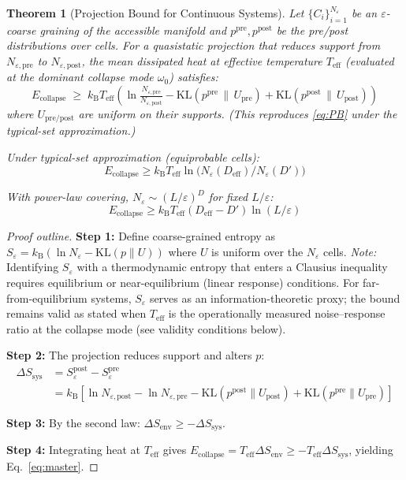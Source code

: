 \documentclass[12pt]{article}
\numberwithin{equation}{section}
\newtheorem{theorem}{Theorem}[section]
\newcommand{\kB}{k_{\mathrm{B}}}
\newcommand{\Teff}{T_{\mathrm{eff}}}
\newcommand{\KL}[2]{\mathrm{KL}\!\left(#1\,\|\,#2\right)}
\begin{document}
\begin{theorem}[Projection Bound for Continuous Systems]
\label{thm:projection}
Let $\{C_i\}_{i=1}^{N_\varepsilon}$ be an $\varepsilon$-coarse graining of the accessible manifold and $p^{\mathrm{pre}},p^{\mathrm{post}}$ be the pre/post distributions over cells. For a quasistatic projection that reduces support from $N_{\varepsilon,\mathrm{pre}}$ to $N_{\varepsilon,\mathrm{post}}$, the mean dissipated heat at effective temperature $\Teff$ (evaluated at the dominant collapse mode $\omega_0$) satisfies:
\begin{equation}
\boxed{E_{\mathrm{collapse}} \;\ge\; \kB\Teff
\left(
\ln \tfrac{N_{\varepsilon,\mathrm{pre}}}{N_{\varepsilon,\mathrm{post}}}
- \KL{p^{\mathrm{pre}}}{U_{\mathrm{pre}}}
+ \KL{p^{\mathrm{post}}}{U_{\mathrm{post}}}
\right)}
\label{eq:master}
\end{equation}
where $U_{\mathrm{pre/post}}$ are uniform on their supports. (This reproduces \eqref{eq:PB} under the typical-set approximation.)

Under typical-set approximation (equiprobable cells):
\begin{equation}
E_{\mathrm{collapse}} \ge \kB\Teff \ln\!\big(N_\varepsilon(D_{\mathrm{eff}})/N_\varepsilon(D')\big)
\end{equation}

With power-law covering, $N_\varepsilon \sim (L/\varepsilon)^D$ for fixed $L/\varepsilon$:
\begin{equation}
E_{\mathrm{collapse}} \geq \kB\Teff (D_{\mathrm{eff}} - D') \ln(L/\varepsilon)
\end{equation}
\end{theorem}

\begin{proof}[Proof outline]
\textbf{Step 1:} Define coarse-grained entropy as $S_\varepsilon = \kB(\ln N_\varepsilon - \mathrm{KL}(p\|U))$ where $U$ is uniform over the $N_\varepsilon$ cells. \emph{Note:} Identifying $S_\varepsilon$ with a thermodynamic entropy that enters a Clausius inequality requires equilibrium or near-equilibrium (linear response) conditions. For far-from-equilibrium systems, $S_\varepsilon$ serves as an information-theoretic proxy; the bound remains valid as stated when $\Teff$ is the operationally measured noise--response ratio at the collapse mode (see validity conditions below).

\textbf{Step 2:} The projection reduces support and alters $p$:
\begin{align}
\Delta S_{\mathrm{sys}} &= S_\varepsilon^{\mathrm{post}} - S_\varepsilon^{\mathrm{pre}} \\
&= \kB[\ln N_{\varepsilon,\mathrm{post}} - \ln N_{\varepsilon,\mathrm{pre}} - \mathrm{KL}(p^{\mathrm{post}}\|U_{\mathrm{post}}) + \mathrm{KL}(p^{\mathrm{pre}}\|U_{\mathrm{pre}})]
\end{align}

\textbf{Step 3:} By the second law: $\Delta S_{\mathrm{env}} \ge -\Delta S_{\mathrm{sys}}$.

\textbf{Step 4:} Integrating heat at $\Teff$ gives $E_{\mathrm{collapse}} = \Teff\Delta S_{\mathrm{env}} \ge -\Teff\Delta S_{\mathrm{sys}}$, yielding Eq.~\ref{eq:master}.
\end{proof}
\end{document}
